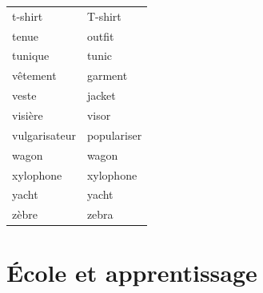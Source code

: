 \documentclass[12pt,a4paper]{article}
\begin{document}
\begin{longtable}{p{4cm} p{6cm}}
t-shirt & T-shirt \\
tenue & outfit \\
tunique & tunic \\
vêtement & garment \\
veste & jacket \\
visière & visor \\
vulgarisateur & populariser \\
wagon & wagon \\
xylophone & xylophone \\
yacht & yacht \\
zèbre & zebra \\
\bottomrule
\end{longtable}

\newpage

\section{École et apprentissage}
\end{document}
